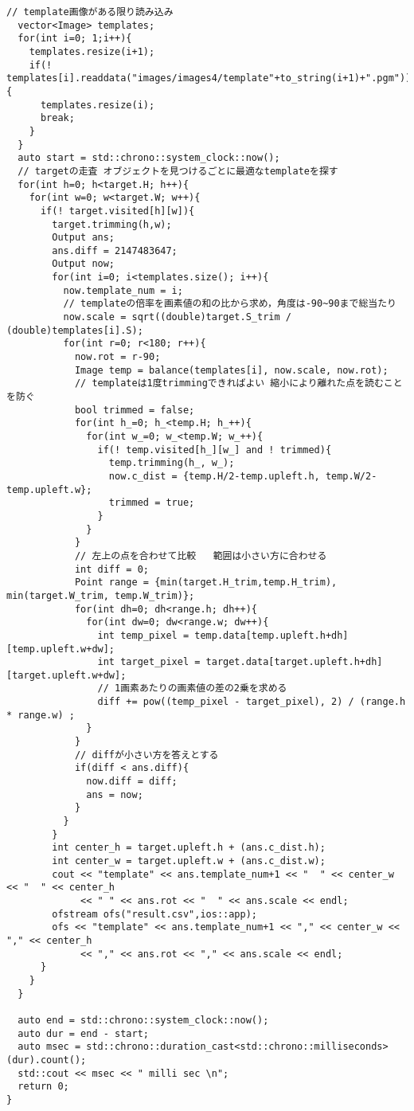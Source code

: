 \begin{lstlisting}[basicstyle=\ttfamily\footnotesize, frame=single]
  // template画像がある限り読み込み
  vector<Image> templates;
  for(int i=0; 1;i++){
    templates.resize(i+1);
    if(! templates[i].readdata("images/images4/template"+to_string(i+1)+".pgm")){
      templates.resize(i);
      break;
    }
  }
  auto start = std::chrono::system_clock::now();
  // targetの走査 オブジェクトを見つけるごとに最適なtemplateを探す
  for(int h=0; h<target.H; h++){
    for(int w=0; w<target.W; w++){
      if(! target.visited[h][w]){
        target.trimming(h,w);
        Output ans;
        ans.diff = 2147483647;
        Output now;
        for(int i=0; i<templates.size(); i++){
          now.template_num = i;
          // templateの倍率を画素値の和の比から求め，角度は-90~90まで総当たり
          now.scale = sqrt((double)target.S_trim / (double)templates[i].S);
          for(int r=0; r<180; r++){
            now.rot = r-90;
            Image temp = balance(templates[i], now.scale, now.rot);
            // templateは1度trimmingできればよい 縮小により離れた点を読むことを防ぐ
            bool trimmed = false;
            for(int h_=0; h_<temp.H; h_++){
              for(int w_=0; w_<temp.W; w_++){
                if(! temp.visited[h_][w_] and ! trimmed){
                  temp.trimming(h_, w_);
                  now.c_dist = {temp.H/2-temp.upleft.h, temp.W/2-temp.upleft.w};
                  trimmed = true;
                }
              }
            }
            // 左上の点を合わせて比較   範囲は小さい方に合わせる
            int diff = 0;
            Point range = {min(target.H_trim,temp.H_trim), min(target.W_trim, temp.W_trim)};
            for(int dh=0; dh<range.h; dh++){
              for(int dw=0; dw<range.w; dw++){
                int temp_pixel = temp.data[temp.upleft.h+dh][temp.upleft.w+dw];
                int target_pixel = target.data[target.upleft.h+dh][target.upleft.w+dw];
                // 1画素あたりの画素値の差の2乗を求める
                diff += pow((temp_pixel - target_pixel), 2) / (range.h * range.w) ;
              }
            }
            // diffが小さい方を答えとする
            if(diff < ans.diff){  
              now.diff = diff;  
              ans = now;
            }
          }
        }
        int center_h = target.upleft.h + (ans.c_dist.h);
        int center_w = target.upleft.w + (ans.c_dist.w);
        cout << "template" << ans.template_num+1 << "  " << center_w << "  " << center_h 
             << " " << ans.rot << "  " << ans.scale << endl;
        ofstream ofs("result.csv",ios::app);
        ofs << "template" << ans.template_num+1 << "," << center_w << "," << center_h 
             << "," << ans.rot << "," << ans.scale << endl;
      }
    }
  }

  auto end = std::chrono::system_clock::now();     
  auto dur = end - start;       
  auto msec = std::chrono::duration_cast<std::chrono::milliseconds>(dur).count();
  std::cout << msec << " milli sec \n";
  return 0;
}


\end{lstlisting}